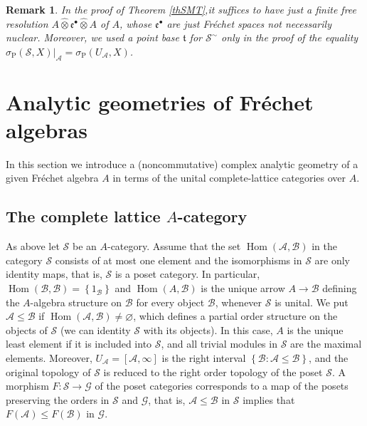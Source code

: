 \documentclass[12pt]{amsart}%
\theoremstyle{plain}
\newtheorem{remark}{Remark}
\numberwithin{equation}{section}
\numberwithin{equation}{section}
\numberwithin{theorem}{section}
\numberwithin{lemma}{section}
\numberwithin{remark}{section}
\numberwithin{example}{section}
\numberwithin{proposition}{section}
\numberwithin{definition}{section}
\numberwithin{corollary}{section}
\begin{document}
\begin{remark}
In the proof of Theorem \ref{thSMT},it suffices to have just a finite free
resolution $A\widehat{\otimes}\mathfrak{e}^{\bullet}\widehat{\otimes}A$ of
$A$, whose $\mathfrak{e}^{\bullet}$ are just Fr\'{e}chet spaces not
necessarily nuclear. Moreover, we used a point base $\mathfrak{t}$ for
$\mathcal{S}^{\sim}$ only in the proof of the equality $\sigma
_{\operatorname{P}}\left(  \mathcal{S},X\right)  |_{\mathcal{A}}%
=\sigma_{\operatorname{P}}\left(  U_{\mathcal{A}},X\right)  $.
\end{remark}

\section{Analytic geometries of Fr\'{e}chet algebras\label{sectionAFA}}

In this section we introduce a (noncommutative) complex analytic geometry of a
given Fr\'{e}chet algebra $A$ in terms of the unital complete-lattice
categories over $A$.

\subsection{The complete lattice $A$-category}

As above let $\mathcal{S}$ be an $A$-category. Assume that the set
$\operatorname{Hom}\left(  \mathcal{A},\mathcal{B}\right)  $ in the category
$\mathcal{S}$ consists of at most one element and the isomorphisms in
$\mathcal{S}$ are only identity maps, that is, $\mathcal{S}$ is a poset
category. In particular, $\operatorname{Hom}\left(  \mathcal{B},\mathcal{B}%
\right)  =\left\{  1_{\mathcal{B}}\right\}  $ and $\operatorname{Hom}\left(
A,\mathcal{B}\right)  $ is the unique arrow $A\rightarrow\mathcal{B}$ defining
the $A$-algebra structure on $\mathcal{B}$ for every object $\mathcal{B}$,
whenever $\mathcal{S}$ is unital. We put $\mathcal{A\leq B}$ if
$\operatorname{Hom}\left(  \mathcal{A},\mathcal{B}\right)  \neq\varnothing$,
which defines a partial order structure on the objects of $\mathcal{S}$ (we
can identity $\mathcal{S}$ with its objects). In this case, $A$ is the unique
least element if it is included into $\mathcal{S}$, and all trivial modules in
$\mathcal{S}$ are the maximal elements. Moreover, $U_{\mathcal{A}}=\left[
\mathcal{A},\infty\right]  $ is the right interval $\left\{  \mathcal{B}%
:\mathcal{A\leq B}\right\}  $, and the original topology of $\mathcal{S}$ is
reduced to the right order topology of the poset $\mathcal{S}$. A morphism
$F:\mathcal{S\rightarrow G}$ of the poset categories corresponds to a map of
the posets preserving the orders in $\mathcal{S}$ and $\mathcal{G}$, that is,
$\mathcal{A\leq B}$ in $\mathcal{S}$ implies that $F\left(  \mathcal{A}%
\right)  \leq F\left(  \mathcal{B}\right)  $ in $\mathcal{G}$.
\end{document}

